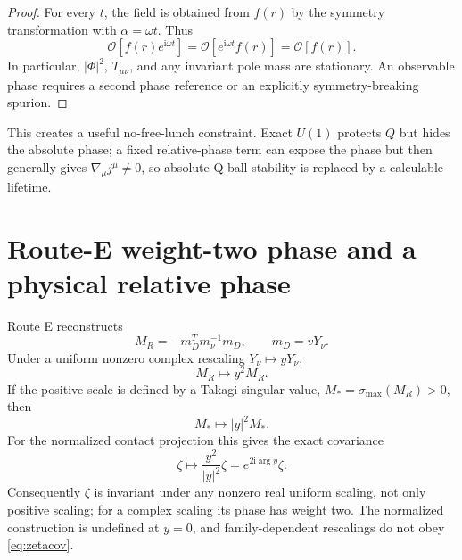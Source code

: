 \documentclass[11pt]{article}
\numberwithin{equation}{section}
\newcommand{\ii}{\mathrm i}
\begin{document}
\begin{proof}
For every \(t\), the field is obtained from \(f(r)\) by the symmetry
transformation with \(\alpha=\omega t\).  Thus
\begin{equation}
 \mathcal O[f(r)e^{\ii\omega t}]
 =\mathcal O[e^{\ii\omega t}f(r)]
 =\mathcal O[f(r)].
\end{equation}
In particular, \(|\Phi|^2\), \(T_{\mu\nu}\), and any invariant pole mass are
stationary.  An observable phase requires a second phase reference or an
explicitly symmetry-breaking spurion.
\end{proof}

This creates a useful no-free-lunch constraint.  Exact \(U(1)\) protects
\(Q\) but hides the absolute phase; a fixed relative-phase term can expose the
phase but then generally gives \(\nabla_\mu j^\mu\ne0\), so absolute Q-ball
stability is replaced by a calculable lifetime.

\section{Route-E weight-two phase and a physical relative phase}

Route E reconstructs
\begin{equation}
 M_R=-m_D^T m_\nu^{-1}m_D,\qquad m_D=vY_\nu.
\end{equation}
Under a uniform nonzero complex rescaling \(Y_\nu\mapsto yY_\nu\),
\begin{equation}
 M_R\mapsto y^2M_R.
\end{equation}
If the positive scale is defined by a Takagi singular value,
\(M_*=\sigma_{\max}(M_R)>0\), then
\begin{equation}
 M_*\mapsto|y|^2M_*.
\end{equation}
For the normalized contact projection this gives the exact covariance
\begin{equation}
 \boxed{\zeta\mapsto\frac{y^2}{|y|^2}\zeta
 =e^{2\ii\arg y}\zeta.}
 \label{eq:zetacov}
\end{equation}
Consequently \(\zeta\) is invariant under any nonzero real uniform scaling,
not only positive scaling; for a complex scaling its phase has weight two.
The normalized construction is undefined at \(y=0\), and family-dependent
rescalings do not obey \eqref{eq:zetacov}.
\end{document}

